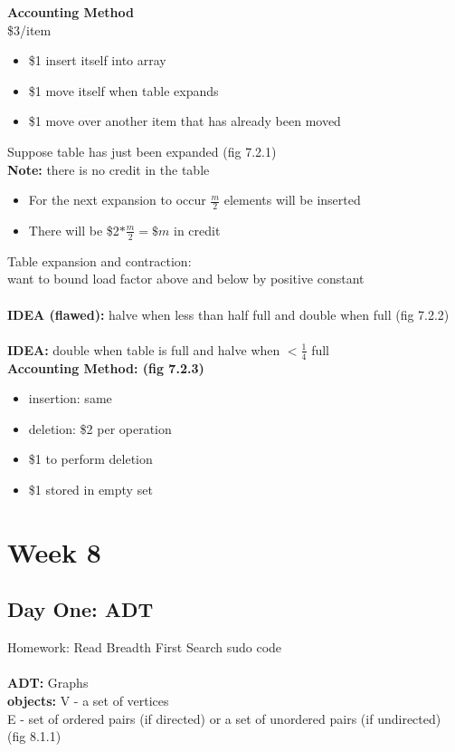 \documentclass{article}
\begin{document}
	\textbf{Accounting Method\\}
	\$3/item
	\begin{itemize}
		\item \$1 insert itself into array
		\item \$1 move itself when table expands
		\item \$1 move over another item that has already been moved\\
	\end{itemize}
	Suppose table has just been expanded (fig 7.2.1)\\
	\textbf{Note:} there is no credit in the table\\
	\begin{itemize}
		\item For the next expansion to occur $\frac{m}{2}$ elements will be inserted
		\item There will be \$2$*\frac{m}{2} = \$m$ in credit\\
	\end{itemize}
	Table expansion and contraction:\\
	want to bound load factor above and below by positive constant\\\\
	\textbf{IDEA (flawed):} halve when less than half full and double when full (fig 7.2.2)\\\\
	\textbf{IDEA:} double when table is full and halve when $<\frac{1}{4}$ full\\
	\textbf{Accounting Method: (fig 7.2.3)}
	\begin{itemize}
		\item insertion: same
		\item deletion: \$2 per operation
		\item \$1 to perform deletion
		\item \$1 stored in empty set
	\end{itemize}
	
	\section{Week 8}
	\subsection{Day One: ADT}
	Homework: Read Breadth First Search sudo code\\\\
	\textbf{ADT: }Graphs\\
	\textbf{objects:} V - a set of vertices\\
	E - set of ordered pairs (if directed) or a set of unordered pairs (if undirected)\\
	(fig 8.1.1)\\\\
	
\end{document}
